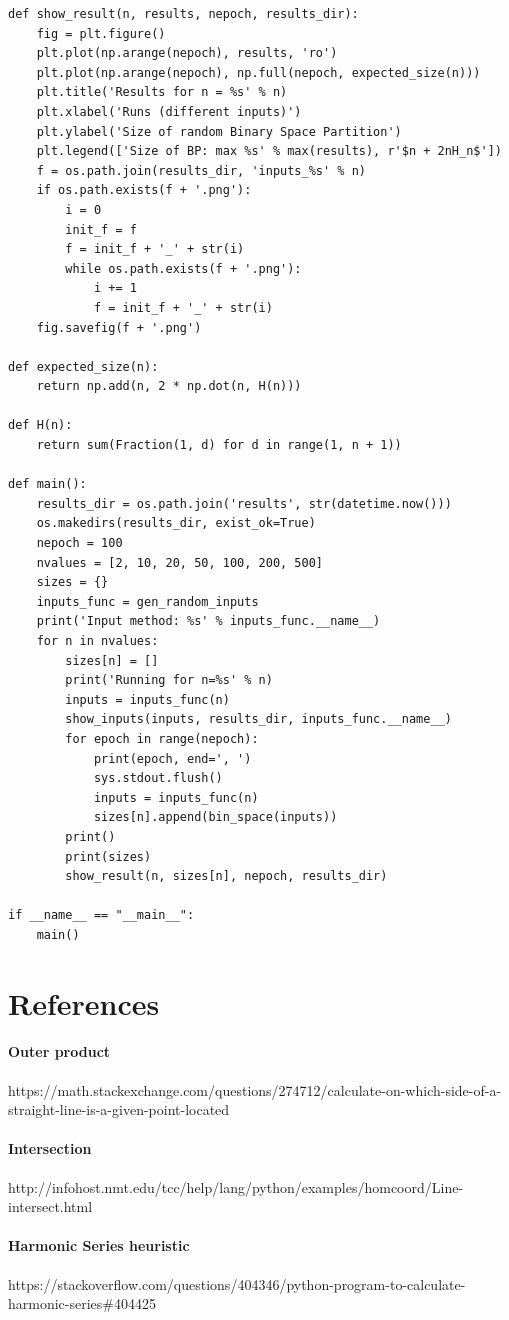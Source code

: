 \documentclass[letterpaper]{article}
\begin{document}
\begin{lstlisting}
def show_result(n, results, nepoch, results_dir):
    fig = plt.figure()
    plt.plot(np.arange(nepoch), results, 'ro')
    plt.plot(np.arange(nepoch), np.full(nepoch, expected_size(n)))
    plt.title('Results for n = %s' % n)
    plt.xlabel('Runs (different inputs)')
    plt.ylabel('Size of random Binary Space Partition')
    plt.legend(['Size of BP: max %s' % max(results), r'$n + 2nH_n$'])
    f = os.path.join(results_dir, 'inputs_%s' % n)
    if os.path.exists(f + '.png'):
        i = 0
        init_f = f
        f = init_f + '_' + str(i)
        while os.path.exists(f + '.png'):
            i += 1
            f = init_f + '_' + str(i)
    fig.savefig(f + '.png')

def expected_size(n):
    return np.add(n, 2 * np.dot(n, H(n)))

def H(n):
    return sum(Fraction(1, d) for d in range(1, n + 1))

def main():
    results_dir = os.path.join('results', str(datetime.now()))
    os.makedirs(results_dir, exist_ok=True)
    nepoch = 100
    nvalues = [2, 10, 20, 50, 100, 200, 500]
    sizes = {}
    inputs_func = gen_random_inputs
    print('Input method: %s' % inputs_func.__name__)
    for n in nvalues:
        sizes[n] = []
        print('Running for n=%s' % n)
        inputs = inputs_func(n)
        show_inputs(inputs, results_dir, inputs_func.__name__)
        for epoch in range(nepoch):
            print(epoch, end=', ')
            sys.stdout.flush()
            inputs = inputs_func(n)
            sizes[n].append(bin_space(inputs))
        print()
        print(sizes)
        show_result(n, sizes[n], nepoch, results_dir)

if __name__ == "__main__":
    main()

\end{lstlisting}

\section*{References}

\paragraph{Outer product} https://math.stackexchange.com/questions/274712/calculate-on-which-side-of-a-straight-line-is-a-given-point-located
\paragraph{Intersection} http://infohost.nmt.edu/tcc/help/lang/python/examples/homcoord/Line-intersect.html
\paragraph{Harmonic Series heuristic} https://stackoverflow.com/questions/404346/python-program-to-calculate-harmonic-series\#404425
\end{document}
